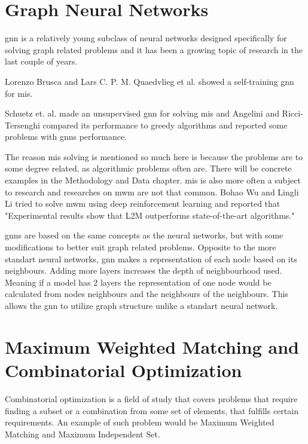 \section{Graph Neural Networks}

\gls{gnn} is a relatively young subclass of neural networks designed specifically for solving graph related problems and it has been a growing topic of research in the last couple of years.

Lorenzo Brusca and Lars C. P. M. Quaedvlieg et al. \cite{brusca2023maximum} showed a self-training \gls{gnn} for \gls{mis}. 

Schuetz et. al. made an unsupervised \gls{gnn} \cite{Schuetz2022} for solving \gls{mis} and Angelini and Ricci-Tersenghi \cite{Angelini2022} compared  its performance to greedy algorithms and reported some problems with \gls{gnn}s performance.

The reason \gls{mis} solving is mentioned so much here is because the problems are to some degree related, as algorithmic problems often are. There will be concrete examples in the Methodology and Data chapter. \gls{mis} is also more often a subject to research and researches on \gls{mwm} are not that common. Bohao Wu and Lingli Li tried to solve \gls{mwm} using deep reinforcement learning \cite{WU2022400} and reported that "Experimental results show that L2M outperforms state-of-the-art algorithms."

\gls{gnn}s are based on the same concepts as the neural networks, but with some modifications to better suit graph related problems. Opposite to the more standart neural networks, \gls{gnn} makes a representation of each node based on its neighbours. Adding more layers increases the depth of neighbourhood used. Meaning if a model has 2 layers the representation of one node would be calculated from nodes neighbours and the neighbours of the neighbours. This allows the \gls{gnn} to utilize graph structure unlike a standart neural network.

\section{Maximum Weighted Matching and Combinatorial Optimization}

Combinatorial optimization is a field of study that covers problems that require finding a subset or a combination from some set of elements, that fulfills certain requirements. An example of such problem would be Maximum Weighted Matching and Maximum Independent Set. 

